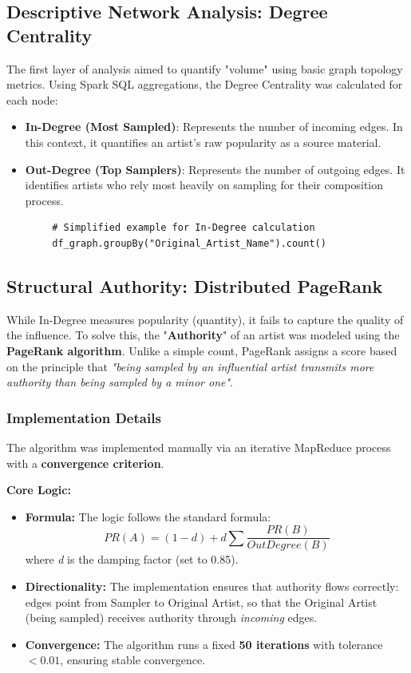 \documentclass[a4paper, 12pt]{article}
\begin{document}
\subsection{Descriptive Network Analysis: Degree Centrality}
The first layer of analysis aimed to quantify "volume" using basic graph topology metrics. Using Spark SQL aggregations, the Degree Centrality was calculated for each node:
\begin{itemize}
    \item \textbf{In-Degree (Most Sampled)}: Represents the number of incoming edges. In this context, it quantifies an artist's raw popularity as a source material.
    \item \textbf{Out-Degree (Top Samplers)}: Represents the number of outgoing edges. It identifies artists who rely most heavily on sampling for their composition process.
\end{itemize}

\begin{listing}[H]
    \begin{verbatim}
        # Simplified example for In-Degree calculation
        df_graph.groupBy("Original_Artist_Name").count()
    \end{verbatim}
    \caption{Code Snippet: Degree Centrality Calculation}
\end{listing}

\subsection{Structural Authority: Distributed PageRank}
While In-Degree measures popularity (quantity), it fails to capture the quality of the influence. To solve this, the "\textbf{Authority}" of an artist was modeled using the \textbf{PageRank algorithm}\cite{page1999pagerank}. Unlike a simple count, PageRank assigns a score based on the principle that \textit{"being sampled by an influential artist transmits more authority than being sampled by a minor one"}.

\subsubsection{Implementation Details}
The algorithm was implemented manually via an iterative MapReduce process with a \textbf{convergence criterion}.

\textbf{Core Logic:}
\begin{itemize}
    \item \textbf{Formula:} The logic follows the standard formula:
    $$ PR(A) = (1 - d) + d \sum \frac{PR(B)}{OutDegree(B)} $$
    where \textit{d} is the damping factor (set to 0.85).
    \item \textbf{Directionality:} The implementation ensures that authority flows correctly: edges point from Sampler to Original Artist, so that the Original Artist (being sampled) receives authority through \textit{incoming} edges.
    \item \textbf{Convergence:} The algorithm runs a fixed \textbf{50 iterations} with tolerance $< 0.01$, ensuring stable convergence.
\end{itemize}
\end{document}
